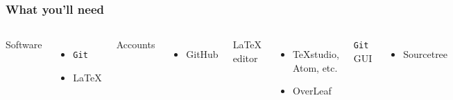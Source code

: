 \documentclass{beamer}
\begin{document}

\begin{frame}
    \frametitle{What you'll need}

\begin{columns}


Software
    \begin{itemize}
        \item \texttt{Git}
        \item \LaTeX
    \end{itemize}
Accounts
    \begin{itemize}
        \item GitHub\footnotemark
    \end{itemize}

\LaTeX{} editor
    \begin{itemize}
        \item TeXstudio, Atom, etc.
        \item OverLeaf
    \end{itemize}
\texttt{Git} GUI
    \begin{itemize}
        \item Sourcetree
    \end{itemize}

   \begin{figure}
    \centering
    \includegraphics[width = 0.9\textwidth]{figs/phd101212s.png}
  \end{figure}
\end{columns}
\end{frame}
\end{document}
